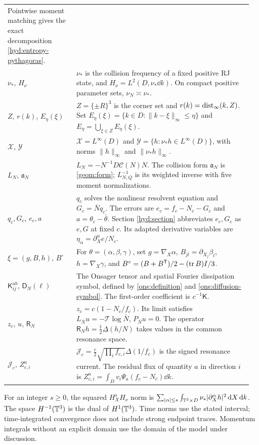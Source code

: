 \begin{longtable}{@{}p{0.27\linewidth}p{0.69\linewidth}@{}}
   Pointwise moment matching gives the exact decomposition
   \eqref{hyd:entropy-pythagoras}.\\
$\nu_*$, $H_\nu$
 & $\nu_*$ is the collision frequency of a fixed positive RJ state,
   and $H_\nu=L^2(D,\nu_*\dd k)$.
   On compact positive parameter sets, $\nu_N\asymp\nu_*$.\\
$Z$, $r(k)$, $E_\eta(\xi)$
 & $Z=\{\pm R\}^3$ is the corner set and $r(k)=\operatorname{dist}_\infty(k,Z)$.
   Set $E_\eta(\xi)=\{k\in D:\|k-\xi\|_\infty\le\eta\}$ and
   $E_\eta=\bigcup_{\xi\in Z}E_\eta(\xi)$.\\
$\mathcal X$, $\mathcal Y$
 & $\mathcal X=L^\infty(D)$ and
   $\mathcal Y=\{h:\nu_*h\in L^\infty(D)\}$,
   with norms $\|h\|_\infty$ and $\|\nu_*h\|_\infty$.\\
$L_N$, $\mathfrak a_N$
 & $L_N=-N^{-1}D\mathcal C(N)N$.
   The collision form $\mathfrak a_N$ is \eqref{geom:form};
   $L_{N,Q}^{-1}$ is its weighted inverse with five moment
   normalizations.\\
$q_c,G_c$, $e_c,a$
 & $q_c$ solves the nonlinear resolvent equation and
   $G_c=\bar Nq_c$.
   The errors are $e_c=f_c-N_c-G_c$ and $a=\theta_c-\bar\theta$.
   Section \ref{hyd:section} abbreviates $e_c,G_c$ as $e,G$
   at fixed $c$. Its adapted derivative variables are
   $\eta_\alpha=\partial_X^\alpha e/N_c$.\\
$\xi=(g,B,h)$, $B^\circ$
 & For $\theta=(\alpha,\beta,\gamma)$, set $g=\nabla_X\alpha$,
   $B_{jl}=\partial_{X_j}\beta_l$, $h=\nabla_X\gamma$, and
   $B^\circ=(B+B^{\mathsf T})/2-(\operatorname{tr} B)I/3$.\\
$\mathsf K_{ij}^{ab}$, $\mathsf D_N(\ell)$
 & The Onsager tensor and spatial Fourier dissipation symbol,
   defined by \eqref{ons:definition} and \eqref{ons:diffusion-symbol}.
   The first-order coefficient is $c^{-1}\mathsf K$.\\
$z_c$, $u$, $\mathsf R_N$
 & $z_c=c(1-N_c/f_c)$.
   Its limit satisfies $L_{\bar N}u=-\mathcal T\log\bar N$,
   $P_{\bar N}u=0$.
   The operator $\mathsf R_Nh=\tfrac12\Delta(h/N)$ takes values
   in the common resonance space.\\
$\mathcal J_c$, $Z_{c,i}^a$
 & $\mathcal J_c=\tfrac c2\sqrt{\prod_i f_{c,i}}\Delta(1/f_c)$
   is the signed resonance current.
   The residual flux of quantity $a$ in direction $i$ is
   $Z_{c,i}^a=\int_Dv_i\Psi_a(f_c-N_c)\dd k$.\\
\bottomrule
\end{longtable}
\endgroup

For an integer $s\ge0$, the squared $H_X^sH_\nu$ norm is
$\sum_{|\alpha|\le s}\int_{\mathbb T^3\times D}
\nu_*|\partial_X^\alpha h|^2\,\mathrm d X\,\mathrm d k$.
The space $H^{-1}(\mathbb T^3)$ is the dual of $H^1(\mathbb T^3)$.
Time norms use the stated interval; time-integrated convergence
does not include strong endpoint traces.
Momentum integrals without an explicit domain use the domain of
the model under discussion.
